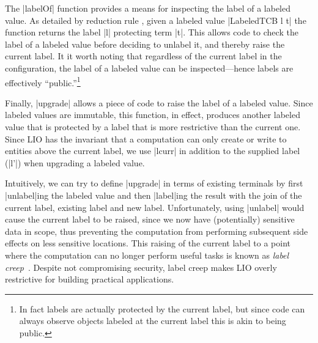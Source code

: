 The |labelOf| function provides a means for inspecting the label of a
labeled value.
%
As detailed by reduction rule , given a labeled value
|LabeledTCB l t| the function returns the label |l| protecting term
|t|.
%
This allows code to check the label of a labeled value before deciding
to unlabel it, and thereby raise the current label.
%
It it worth noting that regardless of the current label in the
configuration, the label of a labeled value can be inspected---hence
labels are effectively ``public.''\footnote{
In fact labels are actually protected by the current label, but since
code can always observe objects labeled at the current label this is
akin to being public.
}

Finally, |upgrade| allows a piece of code to raise the label of a
labeled value.
%
Since labeled values are immutable, this function, in effect, produces
another labeled value that is protected by a label that is more restrictive
than the current one.
%
Since LIO has the invariant that a computation can only create or
write to entities above the current label, we use |lcurr| in addition
to the supplied label (|l'|) when upgrading a labeled value.

Intuitively, we can try to define |upgrade| in terms of existing
terminals by first |unlabel|ing the labeled value and then |label|ing
the result with the join of the current label, existing label and new
label.
%
Unfortunately, using |unlabel| would cause the current label to be
raised, since we now have (potentially) sensitive data in scope, thus
preventing the computation from performing subsequent side effects on
less sensitive locations.
%
%
This raising of the current label to a point where the computation can
no longer perform useful tasks is known as \emph{label
creep}~\cite{sabelfeld:language-based-iflow}.
%
%
Despite not compromising security, label creep makes LIO overly
restrictive for building practical applications. 

